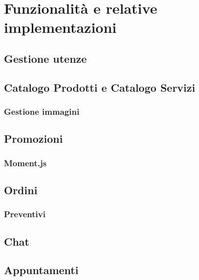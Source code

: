 \chapter{Funzionalità e relative implementazioni}
\section{Gestione utenze}
\section{Catalogo Prodotti e Catalogo Servizi}
\subsection{Gestione immagini}
\section{Promozioni}
\subsection{Moment.js}
\section{Ordini}
\subsection{Preventivi}
\section{Chat}
\section{Appuntamenti}